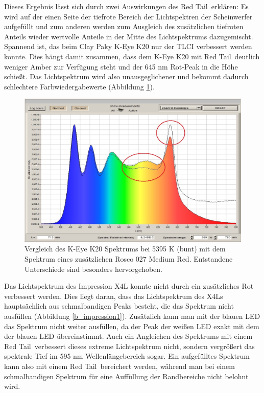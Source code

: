 Dieses Ergebnis lässt sich durch zwei Auswirkungen des \glqq Red Tail\grqq\ erklären: Es wird auf der einen Seite der tiefrote Bereich der Lichtspektren der Scheinwerfer aufgefüllt und zum anderen werden zum Ausgleich des zusätzlichen tiefroten Anteils wieder wertvolle Anteile in der Mitte des Lichtspektrums dazugemischt.\\
Spannend ist, das beim Clay Paky K-Eye K20 nur der TLCI verbessert werden konnte. Dies hängt damit zusammen, dass dem K-Eye K20 mit \glqq Red Tail\grqq\ deutlich weniger Amber zur Verfügung steht und der 645 nm Rot-Peak in die Höhe schießt. Das Lichtspektrum wird also unausgeglichener und bekommt dadurch schlechtere Farbwiedergabewerte (Abbildung \ref{b_keye1}).
\begin{figure}[H]     %
\centering
\includegraphics[width=1.0\textwidth]{bilder/keye1} 
\caption {Vergleich des K-Eye K20 Spektrums bei 5395 K (bunt) mit dem Spektrum eines zusätzlichen Rosco 027 \glqq Medium Red\grqq . Entstandene Unterschiede sind besonders hervorgehoben.}\label{b_keye1}
\end{figure}

Das Lichtspektrum des Impression X4L konnte nicht durch ein zusätzliches Rot verbessert werden. Dies liegt daran, dass das Lichtspektrum des X4Ls hauptsächlich aus schmalbandigen Peaks besteht, die das Spektrum nicht ausfüllen (Abbildung \ref{b_impression1}). Zusätzlich kann man mit der blauen LED das Spektrum nicht weiter ausfüllen, da der Peak der weißen LED exakt mit dem der blauen LED übereinstimmt. Auch ein Angleichen des Spektrums mit einem \glqq Red Tail\grqq\ verbessert dieses extreme Lichtspektrum nicht, sondern vergrößert das spektrale Tief im 595 nm Wellenlängebereich sogar. Ein aufgefülltes Spektrum kann also mit einem \glqq Red Tail\grqq\ bereichert werden, während man bei einem schmalbandigen Spektrum für eine Auffüllung der Randbereiche nicht belohnt wird.\\

